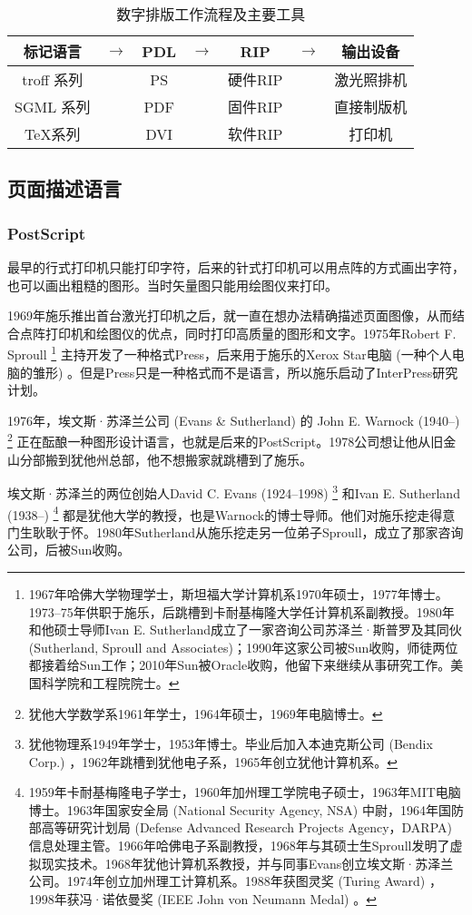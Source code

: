 \begin{table}[!htbp]
\centering
\caption{数字排版工作流程及主要工具}
\label{tab:digital_typesetting}
\begin{tabular}{ccccccc}
    \toprule
    标记语言 & $\to$ & PDL & $\to$ & RIP & $\to$ & 输出设备 \\
    \midrule
    troff 系列 & & PS  & & 硬件RIP & & 激光照排机 \\
    SGML 系列  & & PDF & & 固件RIP & & 直接制版机 \\
    \TeX 系列 & & DVI & & 软件RIP & & 打印机 \\
    \bottomrule
\end{tabular}
\end{table}

\subsection{页面描述语言}

\subsubsection{PostScript}
最早的行式打印机只能打印字符，后来的针式打印机可以用点阵的方式画出字符，也可以画出粗糙的图形。当时矢量图只能用绘图仪来打印。

1969年施乐\indexXerox 推出首台激光打印机之后，就一直在想办法精确描述页面图像，从而结合点阵打印机和绘图仪的优点，同时打印高质量的图形和文字。1975年Robert F. Sproull\indexSproull{} \footnote{1967年哈佛大学物理学士，斯坦福大学计算机系1970年硕士，1977年博士。1973--75年供职于施乐，后跳槽到卡耐基梅隆大学任计算机系副教授。1980年和他硕士导师Ivan E. Sutherland成立了一家咨询公司苏泽兰·斯普罗及其同伙 (Sutherland, Sproull and Associates)；1990年这家公司被Sun收购，师徒两位都接着给Sun工作；2010年Sun被Oracle收购，他留下来继续从事研究工作。美国科学院和工程院院士。} 主持开发了一种格式Press，后来用于施乐的Xerox Star电脑 (一种个人电脑的雏形) 。但是Press只是一种格式而不是语言，所以施乐启动了InterPress研究计划。

1976年，埃文斯·苏泽兰公司 (Evans \& Sutherland)\indexEvansSutherland{} 的 John E. Warnock (1940--)\indexWarnock{} \footnote{犹他大学数学系1961年学士，1964年硕士，1969年电脑博士。} 正在酝酿一种图形设计语言，也就是后来的PostScript。1978公司想让他从旧金山分部搬到犹他州总部，他不想搬家就跳槽到了施乐。

埃文斯·苏泽兰的两位创始人David C. Evans (1924--1998)\indexEvans{} \footnote{犹他物理系1949年学士，1953年博士。毕业后加入本迪克斯公司 (Bendix Corp.) ，1962年跳槽到犹他电子系，1965年创立犹他计算机系。} 和Ivan E. Sutherland (1938--)\indexSutherland{} \footnote{1959年卡耐基梅隆电子学士，1960年加州理工学院电子硕士，1963年MIT电脑博士。1963年国家安全局 (National Security Agency, NSA) 中尉，1964年国防部高等研究计划局 (Defense Advanced Research Projects Agency，DARPA) 信息处理主管。1966年哈佛电子系副教授，1968年与其硕士生Sproull发明了虚拟现实技术。1968年犹他计算机系教授，并与同事Evans创立埃文斯·苏泽兰公司。1974年创立加州理工计算机系。1988年获图灵奖 (Turing Award) ，1998年获冯·诺依曼奖 (IEEE John von Neumann Medal) 。} 都是犹他大学的教授，也是Warnock的博士导师。他们对施乐挖走得意门生耿耿于怀。1980年Sutherland从施乐挖走另一位弟子Sproull，成立了那家咨询公司，后被Sun收购。

